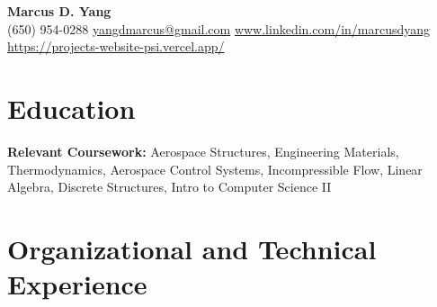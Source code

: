\newcommand{\entrygap}{\vspace{2pt}}



\begin{center}
  {\fontsize{17}{20}\selectfont\bfseries Marcus D. Yang}\\[2pt]
  {\footnotesize (650) 954-0288 \textbar{} \href{mailto:yangdmarcus@gmail.com}{yangdmarcus@gmail.com} \textbar{} \href{https://www.linkedin.com/in/marcusdyang}{www.linkedin.com/in/marcusdyang} \textbar{} \href{https://projects-website-psi.vercel.app/}{https://projects-website-psi.vercel.app/}}
\end{center}

\section{Education}
\textbf{Relevant Coursework:} Aerospace Structures, Engineering Materials, Thermodynamics, Aerospace Control Systems, Incompressible Flow, Linear Algebra, Discrete Structures, Intro to Computer Science II

\section{Organizational and Technical Experience}

